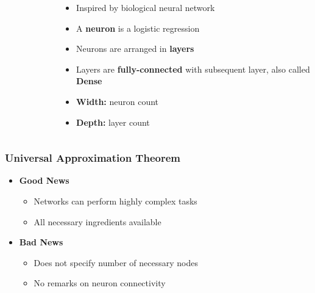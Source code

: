 \documentclass[aspectratio=169]{beamer}
\begin{document}
\begin{frame}
\begin{columns}
\begin{column}{0.48\textwidth}
\begin{figure}
        \end{figure}
    \end{column}
    \begin{column}{0.48\textwidth}
        \begin{itemize}
            \item Inspired by biological neural network
            \item A \textbf{neuron} is a logistic regression
            \item Neurons are arranged in \textbf{layers}
            \item Layers are \textbf{fully-connected} with subsequent layer, also called \textbf{Dense}
            \item \textbf{Width:} neuron count
            \item \textbf{Depth:} layer count
        \end{itemize}
    \end{column}
\end{columns}
\end{frame}

\begin{frame}
\frametitle{Universal Approximation Theorem}

\vspace{0.5cm}
\begin{itemize}
    \item<2-> \textbf{Good News}
    \begin{itemize}
        \item Networks can perform highly complex tasks
        \item All necessary ingredients available
    \end{itemize}
    \item<3-> \textbf{Bad News}
    \begin{itemize}
        \item Does not specify number of necessary nodes
        \item No remarks on neuron connectivity
    \end{itemize}
\end{itemize}
\end{frame}
\end{document}
